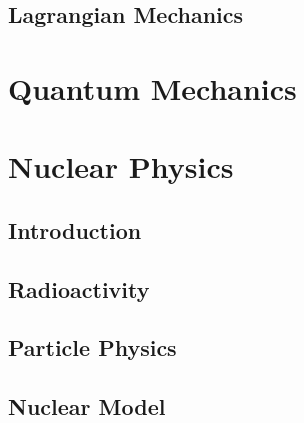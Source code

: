 \documentclass[10pt]{report}
\begin{document}
\section*{Lagrangian Mechanics}
\clearpage
\clearpage

\chapter*{Quantum Mechanics}
\clearpage
\clearpage

\chapter*{Nuclear Physics}
\section*{Introduction}
\clearpage

\section*{Radioactivity}
\clearpage

\section*{Particle Physics}
\clearpage

\section*{Nuclear Model}

\end{document}
